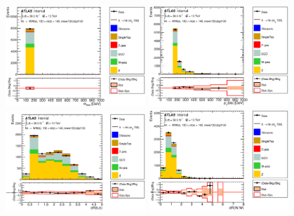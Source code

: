\begin{figure}[!h]
\begin{center}
\includegraphics*[width=0.47\textwidth] {chapters/dihiggs2/figures/ControlPlots/36ifb_CPUpdated_opt700_mBBcr_plots_094/C_mBBcr_opt700ichep_mww_bbpt150_WWMass_regionA_met25d020}
\includegraphics*[width=0.47\textwidth] {chapters/dihiggs2/figures/ControlPlots/36ifb_CPUpdated_opt700_mBBcr_plots_094/C_mBBcr_opt700ichep_mww_bbpt150_bbPt_regionA_met25d020}
\includegraphics*[width=0.47\textwidth] {chapters/dihiggs2/figures/ControlPlots/36ifb_CPUpdated_opt700_mBBcr_plots_094/C_mBBcr_opt700ichep_mww_bbpt150_drbb_regionA_met25d020}
\includegraphics*[width=0.47\textwidth] {chapters/dihiggs2/figures/ControlPlots/36ifb_CPUpdated_opt700_mBBcr_plots_094/C_mBBcr_opt700ichep_mww_bbpt150_drww_regionA_met25d020}

\end{center}
\end{figure}
